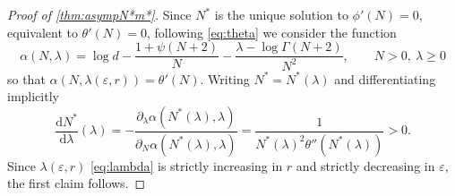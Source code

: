 \documentclass{article}
\def\d{\mathrm{d}}
\def\eps{\varepsilon}
\numberwithin{equation}{section}
\theoremstyle{definition}
\theoremstyle{remark}
\begin{document}
\begin{proof}[Proof of \autoref{thm:asympN*m*}]
Since $N^*$ is the unique solution to $\phi'(N) = 0$, equivalent to $\theta'(N) = 0$, following \eqref{eq:theta} we consider the function
\begin{equation}\label{eq:alphaNlambda}
\alpha(N, \lambda) = \log d -\frac{1 + \psi(N+2)}{N} -\frac{\lambda - \log \Gamma(N+2)}{N^2}, \qquad N > 0, \ \lambda \geq 0
\end{equation}
so that $\alpha(N, \lambda(\eps,r)) = \theta'(N)$. Writing $N^* = N^*(\lambda)$ and differentiating implicitly
\[
\frac{\d N^*}{\d \lambda}(\lambda) = - \frac{\partial_\lambda \alpha(N^*(\lambda), \lambda)}{\partial_N \alpha(N^*(\lambda), \lambda)} = \frac{1}{N^*(\lambda)^2 \theta''(N^*(\lambda))} > 0.
\]
Since $\lambda(\eps,r)$ \eqref{eq:lambda} is strictly increasing in $r$ and strictly decreasing in $\eps$, the first claim follows.


\end{proof}
\end{document}
